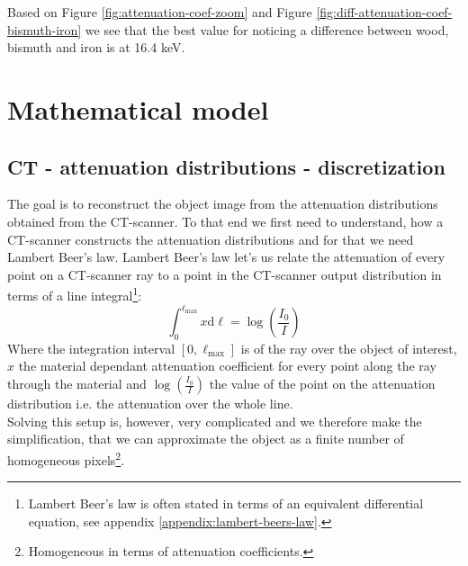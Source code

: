\documentclass{article}
\begin{document}
Based on Figure \ref{fig:attenuation-coef-zoom} and Figure \ref{fig:diff-attenuation-coef-bismuth-iron} we see that the best value for noticing a difference between wood, bismuth and iron is at 16.4 keV. 

\section{Mathematical model}
\subsection{CT - attenuation distributions - discretization}
The goal is to reconstruct the object image from the attenuation distributions obtained from the CT-scanner. To that end we first need to understand, how a CT-scanner constructs the attenuation distributions and for that we need Lambert Beer's law. Lambert Beer's law let's us relate the attenuation of every point on a CT-scanner ray to a point in the CT-scanner output distribution in terms of a line integral\footnote{Lambert Beer's law is often stated in terms of an equivalent differential equation, see appendix \ref{appendix:lambert-beers-law}.}: \\
\begin{equation}
    \int_{0}^{\ell_{\max}}x \text{d} \ell = \log\left(\frac{I_0}{I}\right)
\end{equation}
Where the integration interval $[0, \ell_{\max}]$ is of the ray over the object of interest, $x$ the material dependant attenuation coefficient for every point along the ray through the material and $\log\left(\frac{I_0}{I}\right)$ the value of the point on the attenuation distribution i.e. the attenuation over the whole line. \\
Solving this setup is, however, very complicated and we therefore make the simplification, that we can approximate the object as a finite number of homogeneous pixels\footnote{Homogeneous in terms of attenuation coefficients.}. \\
\end{document}
